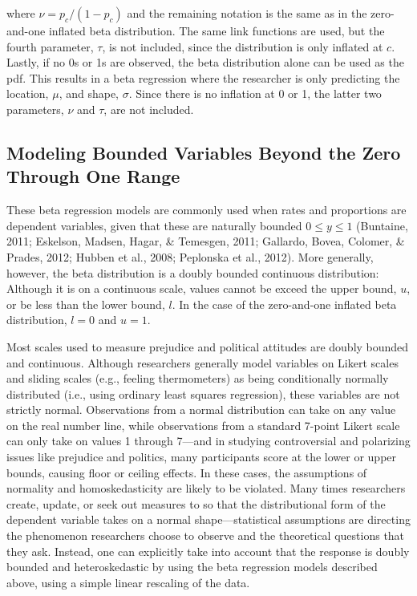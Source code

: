 \documentclass[english,man]{apa6}
\theoremstyle{definition}
\theoremstyle{definition}
\theoremstyle{remark}
\begin{document}
where \(\nu = p_c / (1 - p_c)\) and the remaining notation is the same
as in the zero-and-one inflated beta distribution. The same link
functions are used, but the fourth parameter, \(\tau\), is not included,
since the distribution is only inflated at \(c\). Lastly, if no 0s or 1s
are observed, the beta distribution alone can be used as the pdf. This
results in a beta regression where the researcher is only predicting the
location, \(\mu\), and shape, \(\sigma\). Since there is no inflation at
0 or 1, the latter two parameters, \(\nu\) and \(\tau\), are not
included.

\subsection{Modeling Bounded Variables Beyond the Zero Through One
Range}\label{modeling-bounded-variables-beyond-the-zero-through-one-range}

These beta regression models are commonly used when rates and
proportions are dependent variables, given that these are naturally
bounded \(0 \leq y \leq 1\) (Buntaine, 2011; Eskelson, Madsen, Hagar, \&
Temesgen, 2011; Gallardo, Bovea, Colomer, \& Prades, 2012; Hubben et
al., 2008; Peplonska et al., 2012). More generally, however, the beta
distribution is a doubly bounded continuous distribution: Although it is
on a continuous scale, values cannot be exceed the upper bound, \(u\),
or be less than the lower bound, \(l\). In the case of the zero-and-one
inflated beta distribution, \(l = 0\) and \(u = 1\).

Most scales used to measure prejudice and political attitudes are doubly
bounded and continuous. Although researchers generally model variables
on Likert scales and sliding scales (e.g., feeling thermometers) as
being conditionally normally distributed (i.e., using ordinary least
squares regression), these variables are not strictly normal.
Observations from a normal distribution can take on any value on the
real number line, while observations from a standard 7-point Likert
scale can only take on values 1 through 7---and in studying
controversial and polarizing issues like prejudice and politics, many
participants score at the lower or upper bounds, causing floor or
ceiling effects. In these cases, the assumptions of normality and
homoskedasticity are likely to be violated. Many times researchers
create, update, or seek out measures to so that the distributional form
of the dependent variable takes on a normal shape---statistical
assumptions are directing the phenomenon researchers choose to observe
and the theoretical questions that they ask. Instead, one can explicitly
take into account that the response is doubly bounded and
heteroskedastic by using the beta regression models described above,
using a simple linear rescaling of the data.
\end{document}
